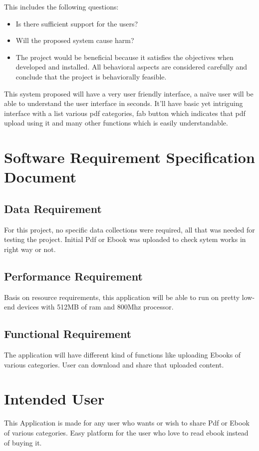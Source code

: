 This includes the following questions:
\begin{itemize}
	\item Is there sufficient support for the users?
	\item Will the proposed system cause harm?
	\item The project would be beneficial because it satisfies the objectives when developed and installed. All behavioral aspects are considered carefully and conclude that the project is behaviorally feasible.
\end{itemize}

This system proposed will have a very user friendly interface, a naïve user will be able to understand the user interface in seconds. It’ll have basic yet intriguing interface with a list various pdf categories, fab button which indicates that pdf upload using it and many other functions which is easily understandable.

\section{Software Requirement Specification Document}
\subsection{Data Requirement}
For this project, no specific data collections were required, all that was needed for testing the project. Initial Pdf or Ebook was uploaded to check sytem works in right way or not.  

\subsection{Performance Requirement}
Basis on resource requirements, this application will be able to run on pretty low-end devices with 512MB of ram and 800Mhz processor.

\subsection{Functional Requirement}
The application will have different kind of functions like uploading Ebooks of various categories. User can download and share that uploaded content.  

\section{Intended User}
This Application is made for any user who wants or wish to share Pdf or Ebook of various categories. Easy platform for the user who love to read ebook instead of buying it. 

